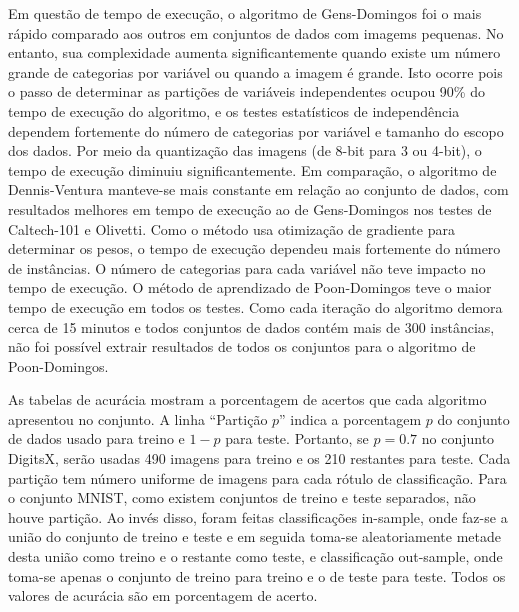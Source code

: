 \documentclass[12pt]{article}
\theoremstyle{plain}
\numberwithin{equation}{section}
\begin{document}
Em questão de tempo de execução, o algoritmo de Gens-Domingos foi o mais rápido comparado aos
outros em conjuntos de dados com imagems pequenas. No entanto, sua complexidade aumenta
significantemente quando existe um número grande de categorias por variável ou quando a imagem é
grande. Isto ocorre pois o passo de determinar as partições de variáveis independentes ocupou 90\%
do tempo de execução do algoritmo, e os testes estatísticos de independência dependem fortemente do
número de categorias por variável e tamanho do escopo dos dados.  Por meio da quantização das
imagens (de 8-bit para 3 ou 4-bit), o tempo de execução diminuiu significantemente. Em comparação,
o algoritmo de Dennis-Ventura manteve-se mais constante em relação ao conjunto de dados, com
resultados melhores em tempo de execução ao de Gens-Domingos nos testes de Caltech-101 e Olivetti.
Como o método usa otimização de gradiente para determinar os pesos, o tempo de execução dependeu
mais fortemente do número de instâncias. O número de categorias para cada variável não teve impacto
no tempo de execução. O método de aprendizado de Poon-Domingos teve o maior tempo de execução em
todos os testes. Como cada iteração do algoritmo demora cerca de 15 minutos e todos conjuntos de
dados contém mais de 300 instâncias, não foi possível extrair resultados de todos os conjuntos para
o algoritmo de Poon-Domingos.

As tabelas de acurácia mostram a porcentagem de acertos que cada algoritmo apresentou no conjunto.
A linha ``Partição $p$'' indica a porcentagem $p$ do conjunto de dados usado para treino e $1-p$
para teste. Portanto, se $p=0.7$ no conjunto DigitsX, serão usadas 490 imagens para treino e os 210
restantes para teste. Cada partição tem número uniforme de imagens para cada rótulo de
classificação. Para o conjunto MNIST, como existem conjuntos de treino e teste separados, não houve
partição. Ao invés disso, foram feitas classificações in-sample, onde faz-se a união do conjunto de
treino e teste e em seguida toma-se aleatoriamente metade desta união como treino e o restante como
teste, e classificação out-sample, onde toma-se apenas o conjunto de treino para treino e o de
teste para teste. Todos os valores de acurácia são em porcentagem de acerto.
\end{document}
